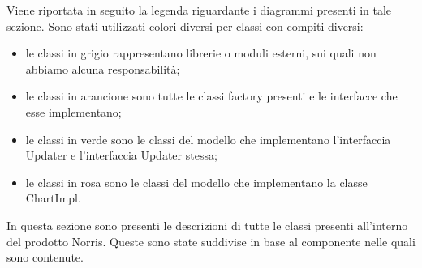 		Viene riportata in seguito la legenda riguardante i diagrammi presenti in tale sezione. Sono stati utilizzati colori diversi per classi con compiti diversi:
		\begin{itemize}
			\item le classi in grigio rappresentano librerie o moduli esterni, sui quali non abbiamo alcuna responsabilità;
			\item le classi in arancione sono tutte le classi factory presenti e le interfacce che esse implementano;
			\item le classi in verde sono le classi del modello che implementano l'interfaccia Updater e l'interfaccia Updater stessa;
			\item le classi in rosa sono le classi del modello che implementano la classe ChartImpl.
		\end{itemize}
		In questa sezione sono presenti le descrizioni di tutte le classi presenti all'interno del prodotto Norris. Queste sono state suddivise in base al componente nelle quali sono contenute.
		

